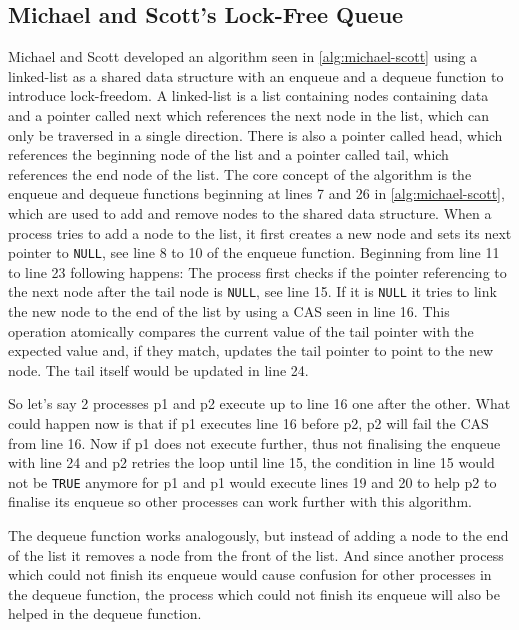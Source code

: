 \subsection{Michael and Scott's Lock-Free Queue}\label{subsec:michael-scott}

Michael and Scott developed an algorithm seen in \cref{alg:michael-scott} using a linked-list as a shared data structure with an enqueue and a dequeue function to introduce lock-freedom. A linked-list is a list containing nodes containing data and a pointer called next which references the next node in the list, which can only be traversed in a single direction. There is also a pointer called head, which references the beginning node of the list and a pointer called tail, which references the end node of the list. The core concept of the algorithm is the enqueue and dequeue functions beginning at lines 7 and 26 in \cref{alg:michael-scott}, which are used to add and remove nodes to the shared data structure. When a process tries to add a node to the list, it first creates a new node and sets its next pointer to \texttt{NULL}, see line 8 to 10 of the enqueue function. Beginning from line 11 to line 23 following happens: The process first checks if the pointer referencing to the next node after the tail node is \texttt{NULL}, see line 15. If it is \texttt{NULL} it tries to link the new node to the end of the list by using a \ac{CAS} seen in line 16. This operation atomically compares the current value of the tail pointer with the expected value and, if they match, updates the tail pointer to point to the new node. The tail itself would be updated in line 24.  \cite{MichaelScottQueue}

So let's say 2 processes p1 and p2 execute up to line 16 one after the other. What could happen now is that if p1 executes line 16 before p2, p2 will fail the \ac{CAS} from line 16. Now if p1 does not execute further, thus not finalising the enqueue with line 24 and p2 retries the loop until line 15, the condition in line 15 would not be \texttt{TRUE} anymore for p1 and p1 would execute lines 19 and 20 to help p2 to finalise its enqueue so other processes can work further with this algorithm. \cite{MichaelScottQueue}

The dequeue function works analogously, but instead of adding a node to the end of the list it removes a node from the front of the list. And since another process which could not finish its enqueue would cause confusion for other processes in the dequeue function, the process which could not finish its enqueue will also be helped in the dequeue function. \cite{MichaelScottQueue}

